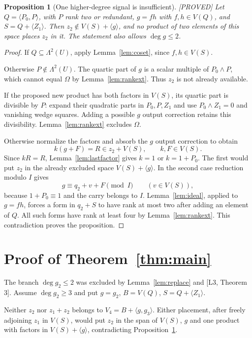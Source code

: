 \documentclass[11pt,a4paper]{article}
\newtheorem{proposition}[theorem]{Proposition}
\newcommand{\status}[1]{\hfill\textsf{[#1]}}
\begin{document}
\begin{proposition}[One higher-degree signal is insufficient]\label{prop:onehigh}\status{PROVED}
Let $Q=\langle P_0,P\rangle$, with $P$ rank two or redundant, $g=fh$ with $f,h\in V(Q)$, and $S=Q+\langle Z_1\rangle$. Then $z_2\notin V(S)+\langle g\rangle$, and no product of two elements of this space places $z_2$ in it. The statement also allows $\deg g\le2$.
\end{proposition}
\begin{proof}
If $Q\subseteq\Lambda^2(U)$, apply Lemma~\ref{lem:coset}, since $f,h\in V(S)$.

Otherwise $P\notin\Lambda^2(U)$. The quartic part of $g$ is a scalar multiple of $P_0\wedge P$, which cannot equal $\Omega$ by Lemma~\ref{lem:rankext}. Thus $z_2$ is not already available.

If the proposed new product has both factors in $V(S)$, its quartic part is divisible by $P$: expand their quadratic parts in $P_0,P,Z_1$ and use $P_0\wedge Z_1=0$ and vanishing wedge squares. Adding a possible $g$ output correction retains this divisibility. Lemma~\ref{lem:rankext} excludes $\Omega$.

Otherwise normalize the factors and absorb the $g$ output correction to obtain
\[
k(g+F)=R\in z_2+V(S),\qquad k,F\in V(S).
\]
Since $kR=R$, Lemma~\ref{lem:lastfactor} gives $k=1$ or $k=1+P_0$. The first would put $z_2$ in the already excluded space $V(S)+\langle g\rangle$. In the second case reduction modulo $I$ gives
\[
g\equiv q_2+v+F\pmod I\qquad(v\in V(S)),
\]
because $1+P_0\equiv1$ and the carry belongs to $I$. Lemma~\ref{lem:ideal}, applied to $g=fh$, forces a form in $q_2+S$ to have rank at most two after adding an element of $Q$. All such forms have rank at least four by Lemma~\ref{lem:rankext}. This contradiction proves the proposition.
\end{proof}

\section[Proof of the main theorem]{Proof of Theorem~\ref{thm:main}}
The branch $\deg g_2\le2$ was excluded by Lemma~\ref{lem:replace} and [L3, Theorem 3]. Assume $\deg g_2\ge3$ and put $g=g_2$, $B=V(Q)$, $S=Q+\langle Z_1\rangle$.

Neither $z_2$ nor $z_1+z_2$ belongs to $V_4=B+\langle g,g_3\rangle$. Either placement, after freely adjoining $z_1$ in $V(S)$, would put $z_2$ in the span of $V(S)$, $g$ and one product with factors in $V(S)+\langle g\rangle$, contradicting Proposition~\ref{prop:onehigh}.
\end{document}
